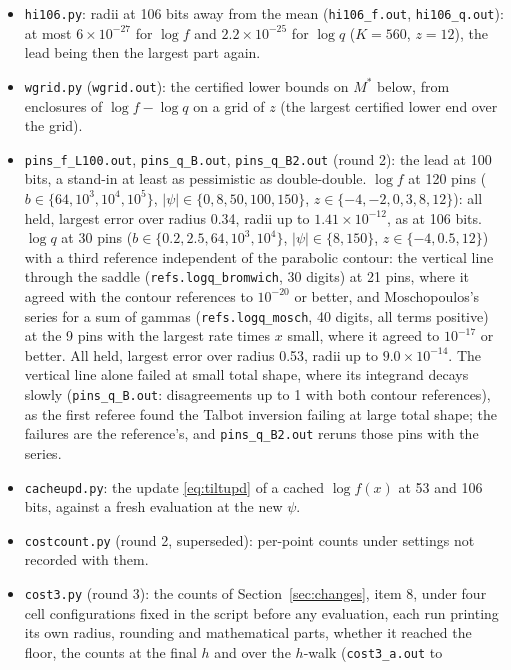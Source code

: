 \begin{itemize}
formula and the tilted one in the same ball arithmetic, at 53 and 106 bits.
\item \texttt{hi106.py}: radii at 106 bits away from the mean (\texttt{hi106\_f.out}, \texttt{hi106\_q.out}): at most
$6\times10^{-27}$ for $\log f$ and $2.2\times10^{-25}$ for $\log q$ ($K=560$, $z=12$), the lead being then the
largest part again.
\item \texttt{wgrid.py} (\texttt{wgrid.out}): the certified lower bounds on $M^*$ below, from enclosures of $\log f-\log q$ on a grid of
$z$ (the largest certified lower end over the grid).
\item \texttt{pins\_f\_L100.out}, \texttt{pins\_q\_B.out}, \texttt{pins\_q\_B2.out} (round 2): the lead at 100 bits,
a stand-in at least as pessimistic as double-double. $\log f$ at 120 pins ($b\in\{64,10^3,10^4,10^5\}$,
$|\psi|\in\{0,8,50,100,150\}$, $z\in\{-4,-2,0,3,8,12\}$): all held, largest error over radius 0.34, radii up to
$1.41\times10^{-12}$, as at 106 bits. $\log q$ at 30 pins ($b\in\{0.2,2.5,64,10^3,10^4\}$, $|\psi|\in\{8,150\}$,
$z\in\{-4,0.5,12\}$) with a third reference independent of the parabolic contour: the vertical line through the
saddle (\texttt{refs.logq\_bromwich}, 30 digits) at 21 pins, where it agreed with the contour references to
$10^{-20}$ or better, and Moschopoulos's series for a sum of gammas \cite{mosch} (\texttt{refs.logq\_mosch}, 40
digits, all terms positive) at the 9 pins with the largest rate times $x$ small, where it agreed to $10^{-17}$ or better. All
held, largest error over radius 0.53, radii up to $9.0\times10^{-14}$. The vertical line alone failed at small
total shape, where its integrand decays slowly (\texttt{pins\_q\_B.out}: disagreements up to 1 with both contour
references), as the first referee found the Talbot inversion failing at large total shape; the failures are the
reference's, and \texttt{pins\_q\_B2.out} reruns those pins with the series.
\item \texttt{cacheupd.py}: the update \eqref{eq:tiltupd} of a cached $\log f(x)$ at 53 and 106 bits, against a
fresh evaluation at the new $\psi$.
\item \texttt{costcount.py} (round 2, superseded): per-point counts under settings not recorded with them.
\item \texttt{cost3.py} (round 3): the counts of Section~\ref{sec:changes}, item 8, under four cell configurations
fixed in the script before any evaluation, each run printing its own radius, rounding and mathematical parts,
whether it reached the floor, the counts at the final $h$ and over the $h$-walk (\texttt{cost3\_a.out} to

\end{itemize}
